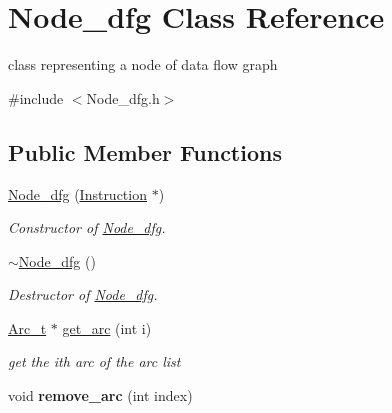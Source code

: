 \hypertarget{class_node__dfg}{}\section{Node\+\_\+dfg Class Reference}
\label{class_node__dfg}


class representing a node of data flow graph  




{\ttfamily \#include $<$Node\+\_\+dfg.\+h$>$}

\subsection*{Public Member Functions}
\begin{DoxyCompactItemize}
\item 
\hypertarget{class_node__dfg_ac9b79961aaadf29eecd03b227b4c0875}{}\hyperlink{class_node__dfg_ac9b79961aaadf29eecd03b227b4c0875}{Node\+\_\+dfg} (\hyperlink{class_instruction}{Instruction} $\ast$)\label{class_node__dfg_ac9b79961aaadf29eecd03b227b4c0875}

\begin{DoxyCompactList}\small\item\em Constructor of \hyperlink{class_node__dfg}{Node\+\_\+dfg}. \end{DoxyCompactList}\item 
\hypertarget{class_node__dfg_a0a2a7c4634ad6802e7c69ab0d95957fa}{}\hyperlink{class_node__dfg_a0a2a7c4634ad6802e7c69ab0d95957fa}{$\sim$\+Node\+\_\+dfg} ()\label{class_node__dfg_a0a2a7c4634ad6802e7c69ab0d95957fa}

\begin{DoxyCompactList}\small\item\em Destructor of \hyperlink{class_node__dfg}{Node\+\_\+dfg}. \end{DoxyCompactList}\item 
\hypertarget{class_node__dfg_adc4a8e37604e57eec03fecaaca094fb5}{}\hyperlink{struct_arc__t}{Arc\+\_\+t} $\ast$ \hyperlink{class_node__dfg_adc4a8e37604e57eec03fecaaca094fb5}{get\+\_\+arc} (int i)\label{class_node__dfg_adc4a8e37604e57eec03fecaaca094fb5}

\begin{DoxyCompactList}\small\item\em get the ith arc of the arc list \end{DoxyCompactList}\item 
\hypertarget{class_node__dfg_a27b393ab78abb865ef7c4e494de894da}{}void {\bfseries remove\+\_\+arc} (int index)\label{class_node__dfg_a27b393ab78abb865ef7c4e494de894da}


\end{DoxyCompactItemize}
